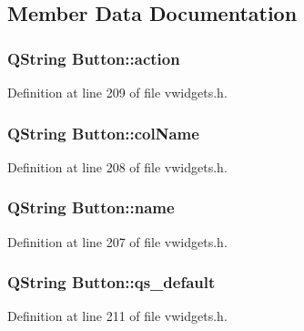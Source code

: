 \subsection{Member Data Documentation}
\hypertarget{classButton_a3d472186a4f3eea8b25c602f1d4df9f5}{
\subsubsection[{action}]{\setlength{\rightskip}{0pt plus 5cm}QString {\bf Button::action}}}
\label{classButton_a3d472186a4f3eea8b25c602f1d4df9f5}


Definition at line 209 of file vwidgets.h.

\hypertarget{classButton_abfcc86863175ffc43eb959f709a24d54}{
\subsubsection[{colName}]{\setlength{\rightskip}{0pt plus 5cm}QString {\bf Button::colName}}}
\label{classButton_abfcc86863175ffc43eb959f709a24d54}


Definition at line 208 of file vwidgets.h.

\hypertarget{classButton_ac1343196c45cdd97326986d07f4f92e6}{
\subsubsection[{name}]{\setlength{\rightskip}{0pt plus 5cm}QString {\bf Button::name}}}
\label{classButton_ac1343196c45cdd97326986d07f4f92e6}


Definition at line 207 of file vwidgets.h.

\hypertarget{classButton_a35ebfc233abcf396424c1b8bd9819668}{
\subsubsection[{qs\_\-default}]{\setlength{\rightskip}{0pt plus 5cm}QString {\bf Button::qs\_\-default}}}
\label{classButton_a35ebfc233abcf396424c1b8bd9819668}


Definition at line 211 of file vwidgets.h.


